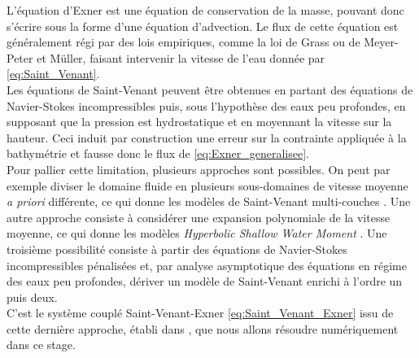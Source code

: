 \documentclass[11pt, a4paper, oneside]{report}
\begin{document}
L'équation d'Exner est une équation de conservation de la masse, pouvant donc s'écrire sous la forme d'une équation d'advection. Le flux de cette équation est généralement régi par des lois empiriques, comme la loi de Grass ou de Meyer-Peter et Müller, faisant intervenir la vitesse de l'eau donnée par \eqref{eq:Saint_Venant}. \\
Les équations de Saint-Venant peuvent être obtenues en partant des équations de Navier-Stokes incompressibles puis, sous l'hypothèse des eaux peu profondes, en supposant que la pression est hydrostatique et en moyennant la vitesse sur la hauteur. Ceci induit par construction une erreur sur la contrainte appliquée à la bathymétrie et fausse donc le flux de \eqref{eq:Exner_generalisee}. \\
Pour pallier cette limitation, plusieurs approches sont possibles. On peut par exemple diviser le domaine fluide en plusieurs sous-domaines de vitesse moyenne \textit{a priori} différente, ce qui donne les modèles de Saint-Venant multi-couches \cite{bonaventura2018multilayer}. Une autre approche consiste à considérer une expansion polynomiale de la vitesse moyenne, ce qui donne les modèles \textit{Hyperbolic Shallow Water Moment} \cite{kowalski2017moment,garres2020shallow,parvin2025coupled}. Une troisième possibilité consiste à partir des équations de Navier-Stokes incompressibles pénalisées et, par analyse asymptotique des équations en régime des eaux peu profondes, dériver un modèle de Saint-Venant enrichi à l'ordre un puis deux. \\
C'est le système couplé Saint-Venant-Exner \eqref{eq:Saint_Venant_Exner} issu de cette dernière approche, établi dans \cite{ba2026coupled}, que nous allons résoudre numériquement dans ce stage. \\
\end{document}
